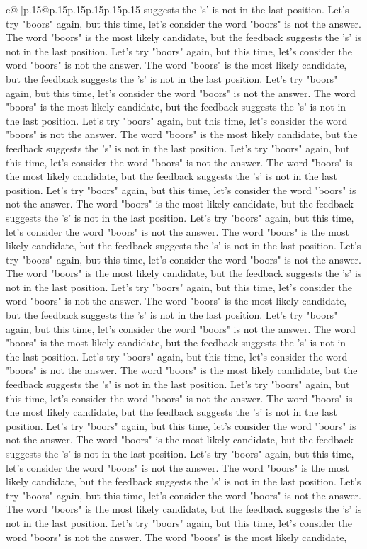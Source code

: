 \documentclass{article}
\begin{document}
{\begin{supertabular}{c@{$\;$}|p{.15\linewidth}@{}p{.15\linewidth}p{.15\linewidth}p{.15\linewidth}p{.15\linewidth}p{.15\linewidth}}
{{{suggests the 's' is not in the last position. Let's try "boors" again, but this time, let's consider the word "boors" is not the answer. The word "boors" is the most likely candidate, but the feedback suggests the 's' is not in the last position. Let's try "boors" again, but this time, let's consider the word "boors" is not the answer. The word "boors" is the most likely candidate, but the feedback suggests the 's' is not in the last position. Let's try "boors" again, but this time, let's consider the word "boors" is not the answer. The word "boors" is the most likely candidate, but the feedback suggests the 's' is not in the last position. Let's try "boors" again, but this time, let's consider the word "boors" is not the answer. The word "boors" is the most likely candidate, but the feedback suggests the 's' is not in the last position. Let's try "boors" again, but this time, let's consider the word "boors" is not the answer. The word "boors" is the most likely candidate, but the feedback suggests the 's' is not in the last position. Let's try "boors" again, but this time, let's consider the word "boors" is not the answer. The word "boors" is the most likely candidate, but the feedback suggests the 's' is not in the last position. Let's try "boors" again, but this time, let's consider the word "boors" is not the answer. The word "boors" is the most likely candidate, but the feedback suggests the 's' is not in the last position. Let's try "boors" again, but this time, let's consider the word "boors" is not the answer. The word "boors" is the most likely candidate, but the feedback suggests the 's' is not in the last position. Let's try "boors" again, but this time, let's consider the word "boors" is not the answer. The word "boors" is the most likely candidate, but the feedback suggests the 's' is not in the last position. Let's try "boors" again, but this time, let's consider the word "boors" is not the answer. The word "boors" is the most likely candidate, but the feedback suggests the 's' is not in the last position. Let's try "boors" again, but this time, let's consider the word "boors" is not the answer. The word "boors" is the most likely candidate, but the feedback suggests the 's' is not in the last position. Let's try "boors" again, but this time, let's consider the word "boors" is not the answer. The word "boors" is the most likely candidate, but the feedback suggests the 's' is not in the last position. Let's try "boors" again, but this time, let's consider the word "boors" is not the answer. The word "boors" is the most likely candidate, but the feedback suggests the 's' is not in the last position. Let's try "boors" again, but this time, let's consider the word "boors" is not the answer. The word "boors" is the most likely candidate, but the feedback suggests the 's' is not in the last position. Let's try "boors" again, but this time, let's consider the word "boors" is not the answer. The word "boors" is the most likely candidate, but the feedback suggests the 's' is not in the last position. Let's try "boors" again, but this time, let's consider the word "boors" is not the answer. The word "boors" is the most likely candidate, }}}
\end{supertabular}}
\end{document}
